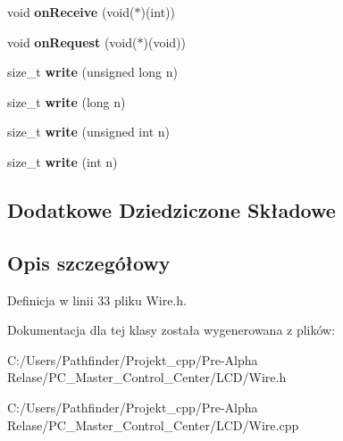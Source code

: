 \begin{DoxyCompactItemize}
\item 
\mbox{\label{class_two_wire_a860d97eb825c6fdca388f2f0577cc34a}} 
void {\bfseries on\+Receive} (void($\ast$)(int))
\item 
\mbox{\label{class_two_wire_a224bf8799dda398fc0db223801852ca5}} 
void {\bfseries on\+Request} (void($\ast$)(void))
\item 
\mbox{\label{class_two_wire_a0c9d09ead8fcddf2a84781fe77d3c975}} 
size\+\_\+t {\bfseries write} (unsigned long n)
\item 
\mbox{\label{class_two_wire_a55a9894186458e43852f6fb7c59bb066}} 
size\+\_\+t {\bfseries write} (long n)
\item 
\mbox{\label{class_two_wire_afdb917746ee37f72e7452b4782e9527b}} 
size\+\_\+t {\bfseries write} (unsigned int n)
\item 
\mbox{\label{class_two_wire_a8ec34b0d2a75e8b2751eb9f4332bd7c3}} 
size\+\_\+t {\bfseries write} (int n)
\end{DoxyCompactItemize}
\subsection*{Dodatkowe Dziedziczone Składowe}


\subsection{Opis szczegółowy}


Definicja w linii 33 pliku Wire.\+h.



Dokumentacja dla tej klasy została wygenerowana z plików\+:\begin{DoxyCompactItemize}
\item 
C\+:/\+Users/\+Pathfinder/\+Projekt\+\_\+cpp/\+Pre-\/\+Alpha Relase/\+P\+C\+\_\+\+Master\+\_\+\+Control\+\_\+\+Center/\+L\+C\+D/Wire.\+h\item 
C\+:/\+Users/\+Pathfinder/\+Projekt\+\_\+cpp/\+Pre-\/\+Alpha Relase/\+P\+C\+\_\+\+Master\+\_\+\+Control\+\_\+\+Center/\+L\+C\+D/Wire.\+cpp\end{DoxyCompactItemize}
